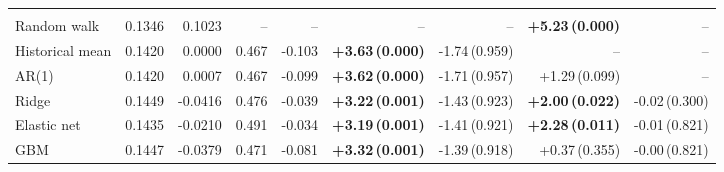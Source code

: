 \begin{tabular}{lrrrrrrrr}
\addlinespace
\multicolumn{9}{l}{\emph{SOL, $h=7$}} \\
\quad Random walk & 0.1346 & 0.1023 & -- & -- & -- & -- & \textbf{+5.23\,(0.000)} & -- \\
\quad Historical mean & 0.1420 & 0.0000 & 0.467 & -0.103 & \textbf{+3.63\,(0.000)} & -1.74\,(0.959) & -- & -- \\
\quad AR(1) & 0.1420 & 0.0007 & 0.467 & -0.099 & \textbf{+3.62\,(0.000)} & -1.71\,(0.957) & +1.29\,(0.099) & -- \\
\quad Ridge & 0.1449 & -0.0416 & 0.476 & -0.039 & \textbf{+3.22\,(0.001)} & -1.43\,(0.923) & \textbf{+2.00\,(0.022)} & -0.02\,(0.300) \\
\quad Elastic net & 0.1435 & -0.0210 & 0.491 & -0.034 & \textbf{+3.19\,(0.001)} & -1.41\,(0.921) & \textbf{+2.28\,(0.011)} & -0.01\,(0.821) \\
\quad GBM & 0.1447 & -0.0379 & 0.471 & -0.081 & \textbf{+3.32\,(0.001)} & -1.39\,(0.918) & +0.37\,(0.355) & -0.00\,(0.821) \\
\bottomrule
\end{tabular}
